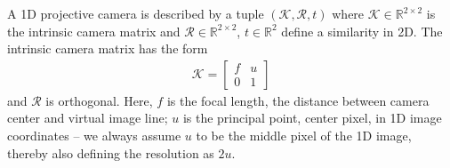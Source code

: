 \begin{definition}
  \label{def:appendix-data-2d-camera}
  A 1D projective camera is described by a tuple $(\mathcal{K}, \mathcal{R}, t)$
  where $\mathcal{K} \in \mathbb{R}^{2\times 2}$ is the intrinsic camera matrix and
  $\mathcal{R} \in \mathbb{R}^{2 \times 2}$, $t \in \mathbb{R}^2$ define
  a similarity in 2D. The intrinsic camera matrix has the form
  \begin{align}
    \mathcal{K} = \left[\begin{matrix}f & u\\ 0 & 1\end{matrix}\right]
  \end{align}
  and $\mathcal{R}$ is orthogonal.
  Here, $f$ is the focal length, \ie
  the distance between camera center and virtual image line; $u$ is the
  principal point, \ie center pixel, in 1D image coordinates --  we always
  assume $u$ to be the middle pixel of the 1D image, thereby also defining the
  resolution as $2u$.
\end{definition}

